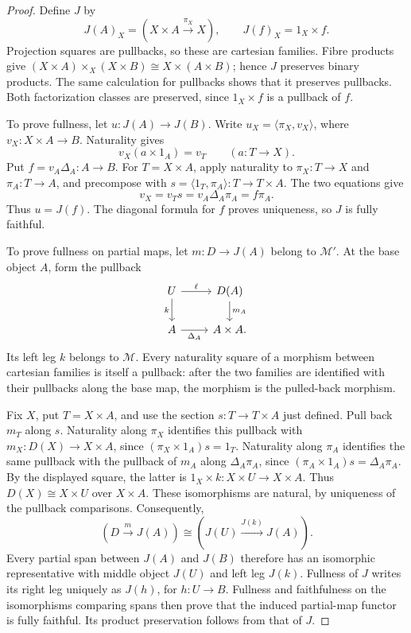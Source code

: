 \documentclass[11pt]{article}
\begin{document}
\begin{proof}
Define $J$ by
\[
J(A)_X=(X\times A\xrightarrow{\pi_X}X),
\qquad J(f)_X=1_X\times f.
\]
Projection squares are pullbacks, so these are cartesian families. Fibre products give
$(X\times A)\times_X(X\times B)\cong X\times(A\times B)$;
hence $J$ preserves binary products. The same calculation for pullbacks shows that it preserves pullbacks. Both factorization classes are preserved, since $1_X\times f$ is a pullback of $f$.

To prove fullness, let $u:J(A)\to J(B)$. Write
$u_X=\langle\pi_X,v_X\rangle$, where $v_X:X\times A\to B$.
Naturality gives
\[
v_X(a\times1_A)=v_T\qquad(a:T\to X).
\]
Put $f=v_A\Delta_A:A\to B$. For $T=X\times A$, apply naturality to $\pi_X:T\to X$ and $\pi_A:T\to A$, and precompose with
$s=\langle1_T,\pi_A\rangle:T\to T\times A$.
The two equations give
\[
v_X=v_Ts=v_A\Delta_A\pi_A=f\pi_A.
\]
Thus $u=J(f)$. The diagonal formula for $f$ proves uniqueness, so $J$ is fully faithful.

To prove fullness on partial maps, let $m:D\to J(A)$ belong to $\mathcal M'$. At the base object $A$, form the pullback
\[
\begin{tikzcd}
U\arrow[r,"\ell"]\arrow[d,"k"']&D(A)\arrow[d,"m_A"]\\
A\arrow[r,"\Delta_A"']&A\times A.
\end{tikzcd}
\]
Its left leg $k$ belongs to $\mathcal M$. Every naturality square of a morphism between cartesian families is itself a pullback: after the two families are identified with their pullbacks along the base map, the morphism is the pulled-back morphism.

Fix $X$, put $T=X\times A$, and use the section $s:T\to T\times A$ just defined. Pull back $m_T$ along $s$. Naturality along $\pi_X$ identifies this pullback with $m_X:D(X)\to X\times A$, since
$(\pi_X\times1_A)s=1_T$.
Naturality along $\pi_A$ identifies the same pullback with the pullback of $m_A$ along $\Delta_A\pi_A$, since
$(\pi_A\times1_A)s=\Delta_A\pi_A$.
By the displayed square, the latter is
$1_X\times k:X\times U\to X\times A$.
Thus $D(X)\cong X\times U$ over $X\times A$. These isomorphisms are natural, by uniqueness of the pullback comparisons. Consequently,
\[
(D\xrightarrow{m}J(A))\cong(J(U)\xrightarrow{J(k)}J(A)).
\]
Every partial span between $J(A)$ and $J(B)$ therefore has an isomorphic representative with middle object $J(U)$ and left leg $J(k)$. Fullness of $J$ writes its right leg uniquely as $J(h)$, for $h:U\to B$. Fullness and faithfulness on the isomorphisms comparing spans then prove that the induced partial-map functor is fully faithful. Its product preservation follows from that of $J$.
\end{proof}
\end{document}
